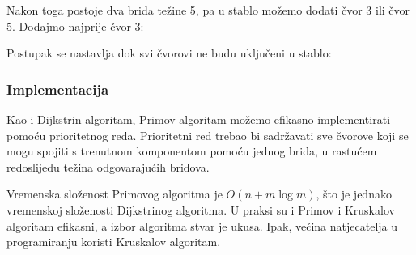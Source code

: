 Nakon toga postoje dva brida težine 5,
pa u stablo možemo dodati čvor 3 ili čvor 5.
Dodajmo najprije čvor 3:
\begin{center}
\end{center}

\begin{samepage}
Postupak se nastavlja dok svi čvorovi ne budu uključeni u stablo:
\begin{center}
\end{center}
\end{samepage}

\subsubsection{Implementacija}

Kao i Dijkstrin algoritam, Primov algoritam možemo
efikasno implementirati pomoću prioritetnog reda.
Prioritetni red trebao bi sadržavati sve čvorove
koji se mogu spojiti s trenutnom komponentom pomoću
jednog brida, u rastućem redoslijedu težina
odgovarajućih bridova.

Vremenska složenost Primovog algoritma je
$O(n + m \log m)$, što je jednako vremenskoj složenosti
Dijkstrinog algoritma.
U praksi su i Primov i Kruskalov algoritam
efikasni, a izbor algoritma
stvar je ukusa.
Ipak, većina natjecatelja u programiranju koristi Kruskalov algoritam.